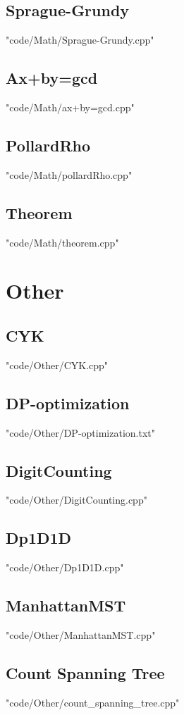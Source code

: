 \subsection{Sprague-Grundy}
 {"code/Math/Sprague-Grundy.cpp"}
\subsection{Ax+by=gcd}
 {"code/Math/ax+by=gcd.cpp"}
\subsection{PollardRho}
 {"code/Math/pollardRho.cpp"}
\subsection{Theorem}
 {"code/Math/theorem.cpp"}
\section{Other}
\subsection{CYK}
 {"code/Other/CYK.cpp"}
\subsection{DP-optimization}
 {"code/Other/DP-optimization.txt"}
\subsection{DigitCounting}
 {"code/Other/DigitCounting.cpp"}
\subsection{Dp1D1D}
 {"code/Other/Dp1D1D.cpp"}
\subsection{ManhattanMST}
 {"code/Other/ManhattanMST.cpp"}
\subsection{Count Spanning Tree}
 {"code/Other/count_spanning_tree.cpp"}
